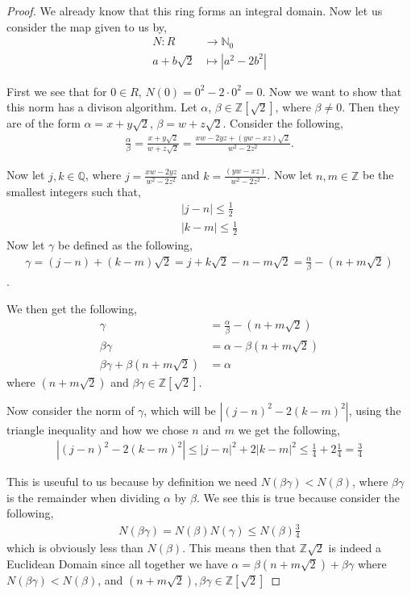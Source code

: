 \documentclass[11pt]{article}
\newcommand{\zz}{\mathbb Z}   %
\newcommand{\qq}{\mathbb Q}   %
\newcommand{\nn}{\mathbb N}   %
\newcommand{\abs}[1]{\left\lvert#1\right\rvert} %
\renewcommand{\leq}{\leqslant}
\begin{document}
\begin{proof}
    We already know that this ring forms an integral domain. Now let us consider the map given to us by,
    \begin{align*}
        N: R &\to \nn_0 \\
        a +b\sqrt2&\mapsto \abs{a^{2} - 2b^{2}} 
    \end{align*}

    First we see that for $0 \in R$, $N(0) = 0^{2} -2\cdot0^{2} = 0$. Now we want to show that this norm has a divison algorithm.  Let $\alpha$, $\beta \in \zz[\sqrt2]$, where $\beta \neq 0$. Then they are of the form $\alpha = x + y \sqrt2$, $\beta = w + z\sqrt2$. Consider the following,
    \begin{align*}
        \frac{\alpha}{\beta} = \frac{x + y\sqrt2}{w + z \sqrt2} = \frac{xw - 2yz + (yw - xz)\sqrt2}{w^{2} - 2z^{2}}.
    \end{align*}

    Now let $j,k \in \qq$, where $j = \frac{xw-2yz}{w^{2}-2z^{2}}$ and $k = \frac{(yw - xz)}{w^{2}-2z^{2}}$. Now let $n,m\in \zz$ be the smallest integers such that,
    \begin{align*}
        \abs{j -n} \leq \frac{1}{2} \\
        \abs{k -m} \leq \frac{1}{2}
    \end{align*}
    Now let $\gamma$ be defined as the following,
    \begin{align*}
        \gamma = (j - n) + (k -m)\sqrt2 = j + k\sqrt2 -n -m\sqrt2 = \frac{\alpha}{\beta} - (n+m\sqrt2)
    \end{align*}.

    We then get the following,
    \begin{align*}
        \gamma &= \frac{\alpha}{\beta} - (n+m\sqrt2) \\
        \beta\gamma &= \alpha - \beta(n+m\sqrt2) \\
        \beta\gamma + \beta(n+m\sqrt2) &= \alpha
    \end{align*}
    where $(n+m\sqrt2)$ and $\beta\gamma \in \zz[\sqrt2]$.


    Now consider the norm of $\gamma$, which will be $\abs{(j-n)^{2} -2(k-m)^{2}}$, using the triangle inequality and how we chose $n$ and $m$ we get the following,
    \begin{align*}
        \abs{(j-n)^{2} -2(k-m)^{2}} \leq \abs{j-n}^{2} + 2\abs{k-m}^{2} \leq \frac{1}{4} + 2\frac{1}{4} = \frac{3}{4}
    \end{align*}

    This is useuful to us because by definition we need $N(\beta\gamma) < N(\beta)$, where $\beta\gamma$ is the remainder when dividing $\alpha$ by $\beta$. We see this is true because consider the following, 
    \begin{align*}
        N(\beta\gamma) = N(\beta)N(\gamma) \leq N(\beta)\frac{3}{4}
    \end{align*}
    which is obviously less than $N(\beta)$. This means then that $\zz\sqrt2$ is indeed a Euclidean Domain since all together we have $\alpha = \beta(n+m\sqrt2) + \beta\gamma$ where $N(\beta\gamma) < N(\beta)$, and $(n+m\sqrt2),\beta\gamma \in \zz[\sqrt2]$ 
\end{proof}
\end{document}
